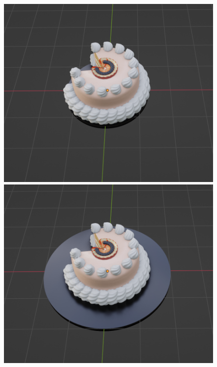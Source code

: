 \begin{figure}[h]
\begin{minipage}[b]{0.48\linewidth}
 \end{minipage}\\
 \begin{minipage}[b]{0.48\linewidth}
  \centering
  \includegraphics[scale=0.25]{./imgs/cakeParamMean/plateSizeMin.png}
 \end{minipage}
 \begin{minipage}[b]{0.48\linewidth}
  \centering
  \includegraphics[scale=0.25]{./imgs/cakeParamMean/plateSizeMax.png}

\end{minipage}
\end{figure}

